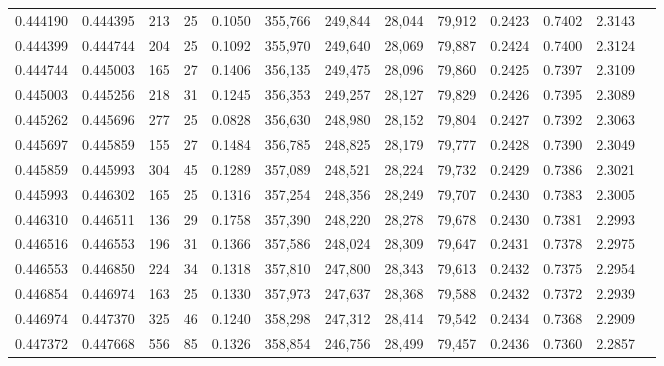 \begin{tabular}{rrrrrrrrrrrrr}
0.444190 & 0.444395 &   213 &  25 &                                     0.1050 & 355,766 & 249,844 &  28,044 &  79,912 & 0.2423 & 0.7402 & 2.3143 \\
0.444399 & 0.444744 &   204 &  25 &                                     0.1092 & 355,970 & 249,640 &  28,069 &  79,887 & 0.2424 & 0.7400 & 2.3124 \\
0.444744 & 0.445003 &   165 &  27 &                                     0.1406 & 356,135 & 249,475 &  28,096 &  79,860 & 0.2425 & 0.7397 & 2.3109 \\
0.445003 & 0.445256 &   218 &  31 &                                     0.1245 & 356,353 & 249,257 &  28,127 &  79,829 & 0.2426 & 0.7395 & 2.3089 \\
0.445262 & 0.445696 &   277 &  25 &                                     0.0828 & 356,630 & 248,980 &  28,152 &  79,804 & 0.2427 & 0.7392 & 2.3063 \\
0.445697 & 0.445859 &   155 &  27 &                                     0.1484 & 356,785 & 248,825 &  28,179 &  79,777 & 0.2428 & 0.7390 & 2.3049 \\
0.445859 & 0.445993 &   304 &  45 &                                     0.1289 & 357,089 & 248,521 &  28,224 &  79,732 & 0.2429 & 0.7386 & 2.3021 \\
0.445993 & 0.446302 &   165 &  25 &                                     0.1316 & 357,254 & 248,356 &  28,249 &  79,707 & 0.2430 & 0.7383 & 2.3005 \\
0.446310 & 0.446511 &   136 &  29 &                                     0.1758 & 357,390 & 248,220 &  28,278 &  79,678 & 0.2430 & 0.7381 & 2.2993 \\
0.446516 & 0.446553 &   196 &  31 &                                     0.1366 & 357,586 & 248,024 &  28,309 &  79,647 & 0.2431 & 0.7378 & 2.2975 \\
0.446553 & 0.446850 &   224 &  34 &                                     0.1318 & 357,810 & 247,800 &  28,343 &  79,613 & 0.2432 & 0.7375 & 2.2954 \\
0.446854 & 0.446974 &   163 &  25 &                                     0.1330 & 357,973 & 247,637 &  28,368 &  79,588 & 0.2432 & 0.7372 & 2.2939 \\
0.446974 & 0.447370 &   325 &  46 &                                     0.1240 & 358,298 & 247,312 &  28,414 &  79,542 & 0.2434 & 0.7368 & 2.2909 \\
0.447372 & 0.447668 &   556 &  85 &                                     0.1326 & 358,854 & 246,756 &  28,499 &  79,457 & 0.2436 & 0.7360 & 2.2857 \\

\end{tabular}
